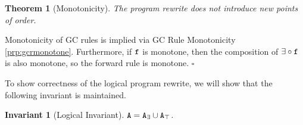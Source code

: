 \documentclass[10pt]{proc}
\numberwithin{equation}{section}
\newtheorem{thm}[theorem]{Theorem}
\newtheorem{invariant}[property]{Invariant}
\newenvironment{proof}[1][Proof]{\begin{trivlist}\item[\hskip \labelsep {\textit {#1:}}]}{\end{trivlist}}
\renewcommand{\tt}[1]{\ifmmode\text{\texttt{#1}}\else\texttt{#1}\fi}
\begin{document}
\begin{thm}[Monotonicity]
The program rewrite does not introduce new points of order.
\end{thm}
\begin{proof}
Monotonicity of GC rules is implied via GC Rule Monotonicity \ref{prp:gcrmonotone}.
Furthermore, if $\tt{f}$ is monotone, then the composition of $\exists \circ \tt{f}$ is also monotone, so the forward rule is monotone.
$\square$
\end{proof}

To show correctness of the logical program rewrite, we will show that the following invariant is maintained.
\begin{invariant}[Logical Invariant]\label{inv:logical}
$\tt{A} = \tt{A}_\exists \cup \tt{A}_\top$.
\end{invariant}
\end{document}
